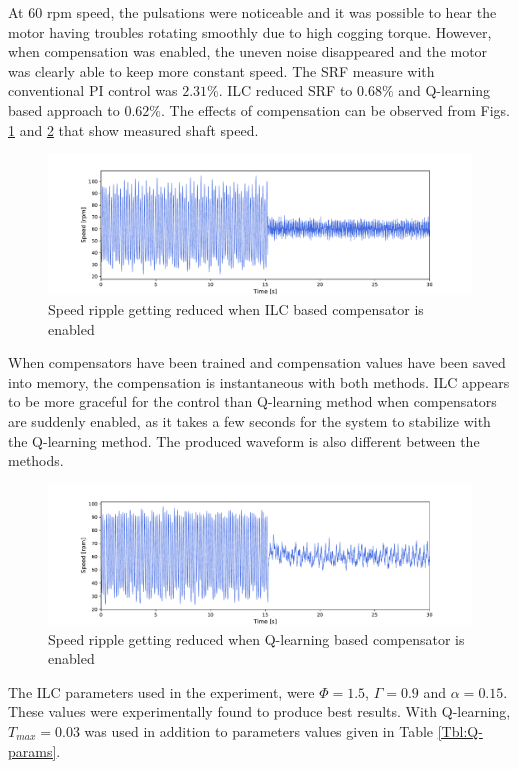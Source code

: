 At $60$ rpm speed, the pulsations were noticeable and it was possible to hear the motor having troubles rotating smoothly due to high cogging torque. However, when compensation was enabled, the uneven noise disappeared and the motor was clearly able to keep more constant speed. The SRF measure with conventional PI control was $2.31\%$. ILC reduced SRF to $0.68\%$ and Q-learning based approach to $0.62\%$. The effects of compensation can be observed from Figs. \ref{fig:ilc-on-off} and \ref{fig:qlr-off-on} that show measured shaft speed.
\begin{figure}[b] 
    \centering
    \includegraphics[width=\textwidth]{images/ILC-SDM251-OFF-ON.pdf}
    \caption{Speed ripple getting reduced when ILC based compensator is enabled}
    \label{fig:ilc-on-off}
\end{figure}
When compensators have been trained and compensation values have been saved into memory, the compensation is instantaneous with both methods. ILC appears to be more graceful for the control than Q-learning method when compensators are suddenly enabled, as it takes a few seconds for the system to stabilize with the Q-learning method. The produced waveform is also different between the methods.
\begin{figure}[tb] 
    \centering
    \includegraphics[width=\textwidth]{images/QLR-SDM251-OFF-ON.pdf}
    \caption{Speed ripple getting reduced when Q-learning based compensator is enabled}
    \label{fig:qlr-off-on}
\end{figure}

The ILC parameters used in the experiment, were $\Phi = 1.5$, $\Gamma = 0.9$ and $ \alpha = 0.15$. These values were experimentally found to produce best results. With Q-learning, $T_{max} = 0.03$ was used in addition to parameters values given in Table \ref{Tbl:Q-params}.


